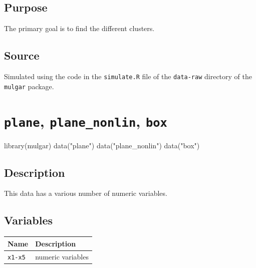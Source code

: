 \documentclass[
  letterpaper,
]{krantz}
\newenvironment{Shaded}{\begin{snugshade}}{\end{snugshade}}
\newcommand{\FunctionTok}[1]{\textcolor[rgb]{0.28,0.35,0.67}{#1}}
\newcommand{\NormalTok}[1]{\textcolor[rgb]{0.00,0.23,0.31}{#1}}
\newcommand{\StringTok}[1]{\textcolor[rgb]{0.13,0.47,0.30}{#1}}
\begin{document}
\subsection*{Purpose}\label{purpose-7}

The primary goal is to find the different clusters.

\subsection*{Source}\label{source-7}

Simulated using the code in the \texttt{simulate.R} file of the
\texttt{data-raw} directory of the \texttt{mulgar} package.

\section{\texorpdfstring{\texttt{plane}, \texttt{plane\_nonlin},
\texttt{box}}{plane, plane\_nonlin, box}}\label{plane-plane_nonlin-box}

\begin{Shaded}
\begin{Highlighting}[]
\FunctionTok{library}\NormalTok{(mulgar)}
\FunctionTok{data}\NormalTok{(}\StringTok{"plane"}\NormalTok{)}
\FunctionTok{data}\NormalTok{(}\StringTok{"plane\_nonlin"}\NormalTok{)}
\FunctionTok{data}\NormalTok{(}\StringTok{"box"}\NormalTok{)}
\end{Highlighting}
\end{Shaded}

\subsection*{Description}\label{description-8}

This data has a various number of numeric variables.

\subsection*{Variables}\label{variables-8}

\begin{longtable}[]{@{}ll@{}}
\toprule\noalign{}
Name & Description \\
\midrule\noalign{}
\endhead
\bottomrule\noalign{}
\endlastfoot
\texttt{x1-x5} & numeric variables \\
\end{longtable}
\end{document}
